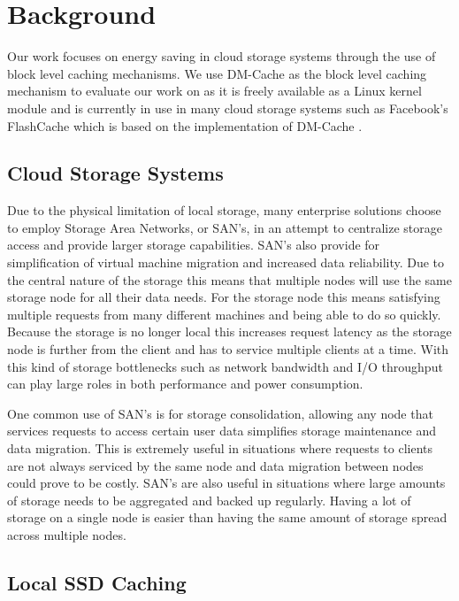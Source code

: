 \section{Background}

Our work focuses on energy saving in cloud storage systems through the use of
block level caching mechanisms. We use DM-Cache as the block level caching
mechanism to evaluate our work on as it is freely available as a Linux kernel
module and is currently in use in many cloud storage systems such as Facebook's
FlashCache which is based on the implementation of DM-Cache \cite{flashcache}.

\subsection{Cloud Storage Systems}

Due to the physical limitation of local storage, many enterprise solutions
choose to employ Storage Area Networks, or SAN's, in an attempt to centralize
storage access and provide larger storage capabilities. SAN's also provide for
simplification of virtual machine migration and increased data reliability. Due
to the central nature of the storage this means that multiple nodes will use the
same storage node for all their data needs. For the storage node this means
satisfying multiple requests from many different machines and being able to do
so quickly. Because the storage is no longer local this increases request
latency as the storage node is further from the client and has to service
multiple clients at a time. With this kind of storage bottlenecks such as
network bandwidth and I/O throughput can play large roles in both performance
and power consumption.

One common use of SAN's is for storage consolidation, allowing any node that
services requests to access certain user data simplifies storage maintenance and
data migration. This is extremely useful in situations where requests to clients
are not always serviced by the same node and data migration between nodes could
prove to be costly. SAN's are also useful in situations where large amounts of
storage needs to be aggregated and backed up regularly. Having a lot of storage
on a single node is easier than having the same amount of storage spread across
multiple nodes.

\subsection{Local SSD Caching}

